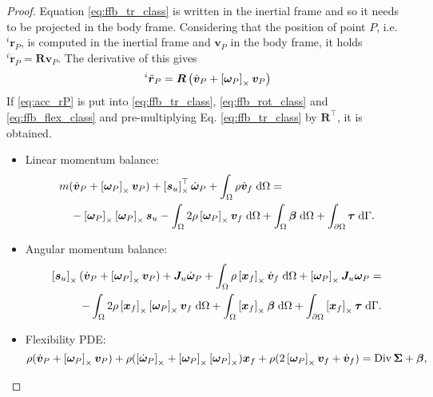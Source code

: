 \begin{proof}
Equation \eqref{eq:ffb_tr_class} is written in the inertial frame and so it needs to be projected in the body frame. Considering that the position of point $P$, i.e. $^{i}{\bm{r}}_P$, is computed in the inertial frame and $\bm{v}_P$ in the body frame, it holds $^{i}\dot{\bm{r}}_P = \bm{R} \bm{v}_P$. The derivative of this gives
\begin{equation}
\label{eq:acc_rP}
^{i}\ddot{\bm{r}}_P = \bm{R} \left(\dot{\bm{v}}_P + \left[\bm{\omega}_P\right]_\times \bm{v}_P \right)
\end{equation}
If \eqref{eq:acc_rP} is put into \eqref{eq:ffb_tr_class}, \eqref{eq:ffb_rot_class} and \eqref{eq:ffb_flex_class} and pre-multiplying  Eq. \eqref{eq:ffb_tr_class} by $\bm{R}^\top$, it is obtained.
\begin{itemize}
	\item Linear momentum balance:
	\begin{equation}
	\label{eq:ffb_tr_int}
	\begin{split}
	&m (\dot{\bm{v}}_P + \crmat{\bm{\omega}_P} \bm{v}_P) + \crmat{\bm{s}_u}^\top \dot{\bm{\omega}}_P  + \int_{\Omega} \rho \dot{\bm{v}}_f \d{\Omega} = \\
	&\quad - \crmat{\bm{\omega}_P} \crmat{\bm{\omega}_P} \bm{s}_u - \int_{\Omega} 2 \rho \crmat{\bm{\omega}_P} {\bm{v}}_f \d{\Omega} +  \int_{\Omega} \bm\beta \d{\Omega} + \int_{\partial \Omega} \bm\tau \d{\Gamma}.
	\end{split}
	\end{equation}
	\item Angular momentum balance:
	\begin{equation}
	\label{eq:ffb_rot_int}
	\begin{split}
	\crmat{\bm{s}_u} (\dot{\bm{v}}_P + \crmat{\bm{\omega}_P} \bm{v}_P) + \bm{J}_u \dot{\bm\omega}_P + \int_{\Omega} \rho \crmat{\bm{x}_f} \dot{\bm{v}}_f \d{\Omega} + \crmat{\bm{\omega}_P} \bm{J}_u \bm{\omega}_P = \\ 
	- \int_{\Omega} 2\rho \crmat{\bm{x}_f} \crmat{\bm\omega_P} {\bm{v}}_f \d{\Omega} + \int_{\Omega}\crmat{\bm{x}_f} \bm\beta \d{\Omega} + \int_{\partial \Omega}\crmat{\bm{x}_f} \bm\tau \d{\Gamma}. \\
	\end{split}
	\end{equation}
	\item Flexibility PDE:
	\begin{equation}
	\label{eq:ffb_flex_int}
	\rho (\dot{\bm{v}}_P + \left[\bm\omega_P\right]_\times \bm{v}_P) + \rho (\left[\dot{\bm\omega}_P\right]_\times + \left[\bm{\omega}_P\right]_\times\left[\bm{\omega}_P\right]_\times)\bm{x}_f + \rho (2 \left[\bm{\omega}_P\right]_\times {\bm{v}}_f + \dot{\bm{v}}_f) = \operatorname*{Div}{\bm\Sigma} + \bm\beta,
	\end{equation}
\end{itemize}


\end{proof}
